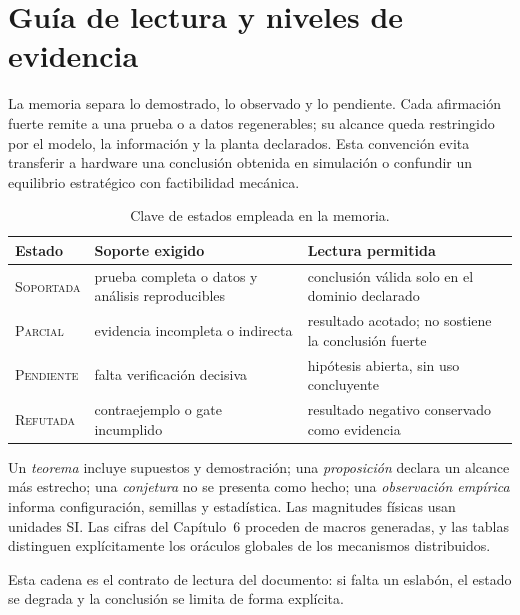 \section*{Guía de lectura y niveles de evidencia}

La memoria separa lo demostrado, lo observado y lo pendiente. Cada afirmación
fuerte remite a una prueba o a datos regenerables; su alcance queda restringido
por el modelo, la información y la planta declarados. Esta convención evita
transferir a hardware una conclusión obtenida en simulación o confundir un
equilibrio estratégico con factibilidad mecánica.

\begin{table}[!htbp]
  \centering
  \caption*{Clave de estados empleada en la memoria.}
  \small
  \renewcommand{\arraystretch}{1.14}
  \begin{tabularx}{\textwidth}{@{}p{2.55cm}p{4.10cm}X@{}}
    \toprule
    Estado & Soporte exigido & Lectura permitida \\
    \midrule
    \textsc{Soportada} & prueba completa o datos y análisis reproducibles & conclusión válida solo en el dominio declarado \\
    \textsc{Parcial} & evidencia incompleta o indirecta & resultado acotado; no sostiene la conclusión fuerte \\
    \textsc{Pendiente} & falta verificación decisiva & hipótesis abierta, sin uso concluyente \\
    \textsc{Refutada} & contraejemplo o gate incumplido & resultado negativo conservado como evidencia \\
    \bottomrule
  \end{tabularx}
\end{table}

Un \emph{teorema} incluye supuestos y demostración; una \emph{proposición}
declara un alcance más estrecho; una \emph{conjetura} no se presenta como
hecho; una \emph{observación empírica} informa configuración, semillas y
estadística. Las magnitudes físicas usan unidades SI. Las cifras del
Capítulo~6 proceden de macros generadas, y las tablas distinguen explícitamente
los oráculos globales de los mecanismos distribuidos.

\begin{center}
\end{center}

Esta cadena es el contrato de lectura del documento: si falta un eslabón, el
estado se degrada y la conclusión se limita de forma explícita.
